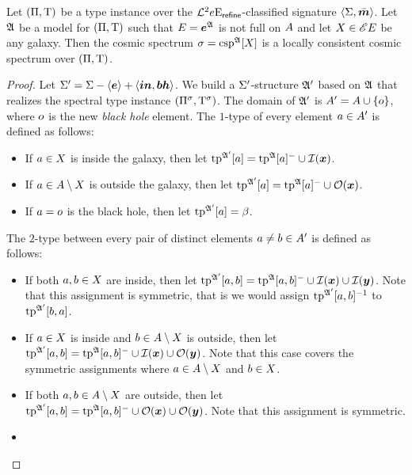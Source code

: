 \begin{remark}\label{rem:csp-is-locally-consistent}
Let $(\Pi,\mathrm{T})$ be a type instance over the
$\mathcal{L}^{2}{e}\mathrm{E}_{\mathsf{refine}}$-classified signature $\left\langle \mathrm{\Sigma},\bar{\bm{m}} \right\rangle$.
Let $\mathfrak{A}$ be a model for $(\Pi,\mathrm{T})$ such that $E =
\bm{e}^{\mathfrak{A}}$ is not full on $A$ and let $X \in {\mathscr{E}E}$ be any galaxy.
Then the cosmic spectrum $\sigma = \operatorname{csp}^{\mathfrak{A}}[X]$ is a locally consistent
cosmic spectrum over $(\Pi,\mathrm{T})$.
\end{remark}
\begin{proof}
Let $\mathrm{\Sigma'} = \mathrm{\Sigma} - \left\langle \bm{e} \right\rangle + \left\langle \bm{in},\bm{bh} \right\rangle$.
We build a $\mathrm{\Sigma'}$-structure $\mathfrak{A'}$ based on $\mathfrak{A}$ that realizes the
spectral type instance $(\Pi^{\sigma},\mathrm{T}^{\sigma})$.
The domain of $\mathfrak{A'}$ is 
$A' = A \cup \left\{o\right\}$, where $o$ is the new \emph{black hole}
element.
The $1$-type of every element $a \in A'$ is defined as follows:
\begin{itemize}
  \item[\refsticondI]
  If $a \in X$ is inside the galaxy, then let
  $\operatorname{tp}^{\mathfrak{A'}}[a] = \operatorname{tp}^{\mathfrak{A}}[a]^{-} \cup \mathcal{I}(\bm{x})$.
  \item[\refsticondO]
  If $a \in A \setminus X$ is outside the galaxy, then let
  $\operatorname{tp}^{\mathfrak{A'}}[a] = \operatorname{tp}^{\mathfrak{A}}[a]^{-} \cup \mathcal{O}(\bm{x})$.
  \item[\refsticondB] If $a = o$ is the black hole, then let
  $\operatorname{tp}^{\mathfrak{A'}}[a] = \beta$.
\end{itemize}
The $2$-type between every pair of distinct elements $a \neq b \in A'$
is defined as follows:
\begin{itemize}
  \item[\refsticondII]
  If both $a,b \in X$ are inside, then let
  $\operatorname{tp}^{\mathfrak{A'}}[a,b] = \operatorname{tp}^{\mathfrak{A}}[a,b]^{-} \cup \mathcal{I}(\bm{x}) \cup \mathcal{I}(\bm{y})$.
  Note that this assignment is symmetric, that is we would assign
  $\operatorname{tp}^{\mathfrak{A'}}[a,b]^{-1}$ to $\operatorname{tp}^{\mathfrak{A'}}[b,a]$.
  \item[\refsticondIO]
  If $a \in X$ is inside and $b \in A \setminus
  X$ is outside, then let
  $\operatorname{tp}^{\mathfrak{A'}}[a,b] = \operatorname{tp}^{\mathfrak{A}}[a,b]^{-} \cup \mathcal{I}(\bm{x}) \cup \mathcal{O}(\bm{y})$.
  Note that this case covers the symmetric assignments where $a \in
  A\setminus X$ and $b \in X$.
  \item[\refsticondOO]
  If both $a, b \in A\setminus X$ are outside, then let
  $\operatorname{tp}^{\mathfrak{A'}}[a,b] = \operatorname{tp}^{\mathfrak{A}}[a,b]^{-} \cup \mathcal{O}(\bm{x}) \cup
  \mathcal{O}(\bm{y})$. Note that this assignment is symmetric.
  \item[\refsticondIB]

\end{itemize}
\end{proof}
